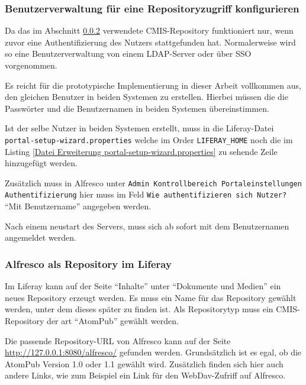 \subsubsection{Benutzerverwaltung f\"ur eine Repositoryzugriff konfigurieren}
Da das im Abschnitt \ref{Alfresco als Repository im Liferay} verwendete CMIS-Repository funktioniert nur, wenn zuvor eine Authentifizierung des Nutzers stattgefunden hat. Normalerweise wird so eine Benutzerverwaltung von einem LDAP-Server oder \"uber SSO vorgenommen. 

Es reicht f\"ur die prototypische Implementierung in dieser Arbeit vollkommen aus, den gleichen Benutzer in beiden Systemen zu erstellen. Hierbei m\"ussen die die Passw\"orter und die Benutzernamen in beiden Systemen \"ubereinstimmen.

Ist der selbe Nutzer in beiden Systemen erstellt, muss in die Liferay-Datei \texttt{portal-setup-wizard.properties} welche im Order \texttt{LIFERAY\_HOME} noch die im Listing \ref{Datei Erweiterung portal-setup-wizard.properties} zu sehende Zeile hinzugef\"ugt werden. \cite{CMIS_Repo}



Zus\"atzlich muss in Alfresco unter \texttt{Admin \MVRightarrow Kontrollbereich \MVRightarrow Portaleinstellungen \MVRightarrow} \\
\texttt{Authentifizierung} hier muss im Feld \texttt{Wie authentifizieren sich Nutzer?} "`Mit Benutzername"' angegeben werden.

Nach einem neustart des Servers, muss sich ab sofort mit dem Benutzernamen angemeldet werden. \cite{CMIS_Config}

\subsubsection{Alfresco als Repository im Liferay}\label{Alfresco als Repository im Liferay}
Im Liferay kann auf der Seite "`Inhalte"' unter "`Dokumente und Medien"' ein neues Repository erzeugt werden. Es muss ein Name f\"ur das Repository gew\"ahlt werden, unter dem dieses sp\"ater zu finden ist. Als Repositorytyp muss ein \ac{CMIS}-Repository der art "`AtomPub"' gew\"ahlt werden. 

Die passende Repository-URL von Alfresco kann auf der Seite \url{http://127.0.0.1:8080/alfresco/} gefunden werden. Grunds\"atzlich ist es egal, ob die AtomPub Version 1.0 oder 1.1 gew\"ahlt wird. Zus\"atzlich finden sich hier auch andere Links, wie zum Beispiel ein Link f\"ur den WebDav-Zufriff auf Alfresco.

